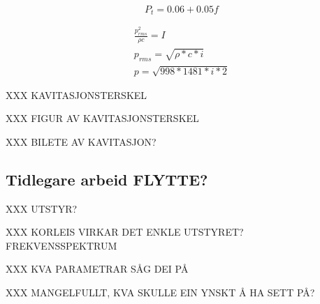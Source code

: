 \begin{equation}
\label{kavitasjonsterskel}
P_t = 0.06 + 0.05f
\end{equation}

\begin{eqnarray}
	\label{kavitasjonsterskel2}
	\frac{p^2_{rms}}{\rho c} = I \\
	p_{rms} = \sqrt{\rho* c * i} \\
	p = \sqrt{998* 1481 * i * 2} 
\end{eqnarray}


XXX KAVITASJONSTERSKEL

XXX FIGUR AV KAVITASJONSTERSKEL

XXX BILETE AV KAVITASJON?

\subsection{Tidlegare arbeid FLYTTE?}
XXX UTSTYR?

XXX KORLEIS VIRKAR DET ENKLE UTSTYRET? FREKVENSSPEKTRUM

XXX KVA PARAMETRAR SÅG DEI PÅ

XXX MANGELFULLT, KVA SKULLE EIN YNSKT Å HA SETT PÅ?
